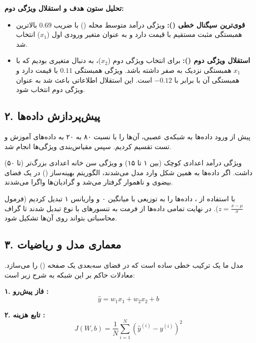 \noindent \textbf{تحلیل ستون هدف و استقلال ویژگی دوم:}
\begin{itemize}
    \item \textbf{قوی‌ترین سیگنال خطی ():} ویژگی درآمد متوسط محله () با ضریب $0.69$ بالاترین همبستگی مثبت مستقیم با قیمت دارد و به عنوان متغیر ورودی اول ($x_1$) انتخاب شد.
    \item \textbf{استقلال ویژگی دوم ():} برای انتخاب ویژگی دوم ($x_2$)، به دنبال متغیری بودیم که با $x_1$ همبستگی نزدیک به صفر داشته باشد. ویژگی  همبستگی $0.11$ با قیمت دارد و همبستگی آن با  برابر با $-0.12$ است. این استقلال اطلاعاتی باعث شد  به عنوان ویژگی دوم انتخاب شود.
\end{itemize}

\subsection{۲. پیش‌پردازش داده‌ها }

پیش از ورود داده‌ها به شبکه‌ی عصبی، آن‌ها را با نسبت ۸۰ به ۲۰ به داده‌های آموزش و تست تقسیم کردیم. سپس مقیاس‌بندی ویژگی‌ها انجام شد.

\begin{warnbox}
ویژگی درآمد اعدادی کوچک (بین ۱ تا ۱۵) و ویژگی سن خانه اعدادی بزرگ‌تر (تا ۵۰) داشت. اگر داده‌ها به همین شکل وارد مدل می‌شدند، الگوریتم بهینه‌ساز () در یک فضای بیضوی و ناهموار گرفتار می‌شد و گرادیان‌ها واگرا می‌شدند.
\end{warnbox}

با استفاده از ، داده‌ها را به توزیعی با میانگین ۰ و واریانس ۱ تبدیل کردیم (فرمول $z = \frac{x - \mu}{\sigma}$). در نهایت تمامی داده‌ها از فرمت  به تنسورهای  با نوع  تبدیل شدند تا گراف محاسباتی بتواند روی آن‌ها تشکیل شود.

\subsection{۳. معماری مدل و ریاضیات}

مدل ما یک ترکیب خطی ساده است که در فضای سه‌بعدی یک صفحه () را می‌سازد. معادلات حاکم بر این شبکه به شرح زیر است:

\textbf{۱. فاز پیش‌رو :}
\[
\hat{y} = w_1 x_1 + w_2 x_2 + b
\]

\textbf{۲. تابع هزینه :}
\[
J(W, b) = \frac{1}{N} \sum_{i=1}^{N} (\hat{y}^{(i)} - y^{(i)})^2
\]

